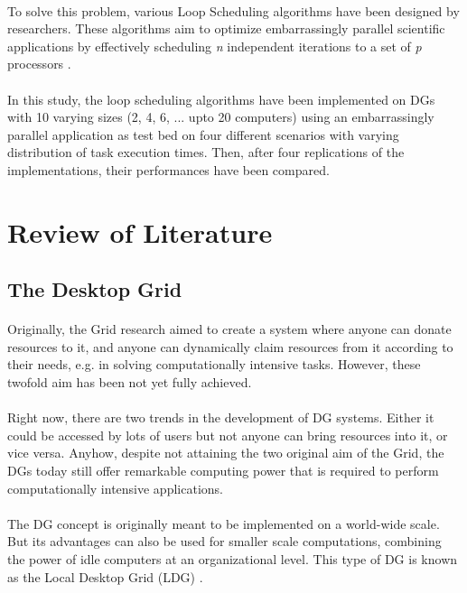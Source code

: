 \documentclass[10pt, twocolumn, letterpaper]{article}
\begin{document}
\paragraph{}
To solve this problem, various Loop Scheduling algorithms have been designed by researchers. These algorithms aim to optimize embarrassingly parallel scientific applications by effectively scheduling \textit{n} independent iterations to a set of \textit{p} processors \cite{tabirca}.

\paragraph{}
In this study, the loop scheduling algorithms have been implemented on DGs with 10 varying sizes (2, 4, 6, ... upto 20 computers) using an embarrassingly parallel application as test bed on four different scenarios with varying distribution of task execution times. Then, after four replications of the implementations, their performances have been compared.

\section{Review of Literature}

\subsection{The Desktop Grid}

\paragraph{}
Originally, the Grid research aimed to create a system where anyone can donate resources to it, and anyone can dynamically claim resources from it according to their needs, e.g. in solving computationally intensive tasks. However, these twofold aim has been not yet fully achieved.

\paragraph{}
Right now, there are two trends in the development of DG systems. Either it could be accessed by lots of users but not anyone can bring resources into it, or vice versa. Anyhow, despite not attaining the two original aim of the Grid, the DGs today still offer remarkable computing power that is required to perform computationally intensive applications.

\paragraph{}
The DG concept is originally meant to be implemented on a world-wide scale. But its advantages can also be used for smaller scale computations, combining the power of idle computers at an organizational level. This type of DG is known as the Local Desktop Grid (LDG) \cite{balaton}.
\end{document}
